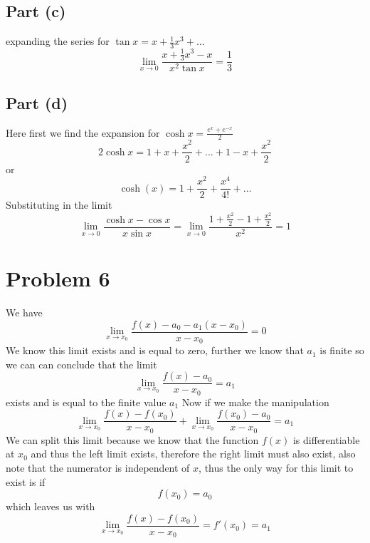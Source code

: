 \documentclass[12pt]{article}
\begin{document}
\subsection{Part (c)}
expanding the series for $\tan x = x + \frac{1}{3 }x^{3} + \dots$ 
$$
\lim_{ x \to 0 } \frac{x + \frac{1}{3}x^{3}-x}{x^{2}\tan x} = \frac{1}{3}
$$
\subsection{Part (d)}
Here first we find the expansion for $\cosh x = \frac{e^{ x } + e^{ -x }}{2}$
$$
2\cosh x = 1 + x + \frac{x^{2}}{2} + \dots + 1-x + \frac{x^{2}}{2}
$$
or
$$
\cosh(x) = 1 + \frac{x^{2}}{2} + \frac{x^{4}}{4!} + \dots
$$
Substituting in the limit
$$
\lim_{  x \to 0 } \frac{\cosh x - \cos x}{x\sin x} = \lim_{ x \to 0 } \frac{1+\frac{x^{2}}{2} -1 + \frac{x^{2}}{2}}{x^{2}} = 1
$$

\section*{Problem 6}
We have
$$
\lim_{ x \to x_{0} } \frac{f(x) -a_{0} -a_{1}(x-x_{0})}{x-x_{0}} = 0
$$
We know this limit exists and is equal to zero, further we know that $a_{1}$
 is finite so we can can conclude that the limit
 $$
\lim_{ x \to x_{0} } \frac{f(x)-a_{0}}{x-x_{0}} = a_{1}
$$
exists and is equal to the finite value $a_{1}$ Now if we make the manipulation
$$
\lim_{ x \to x_{0} } \frac{f(x)-f(x_{0})}{x-x_{0}} + \lim_{ x \to x_{0} } \frac{f(x_{0})-a_{0}}{x-x_{0}} = a_{1}
$$
We can split this limit because we know that the function $f(x)$ is differentiable at $x_{0}$ and thus the left limit exists, therefore the right limit must also exist, also note that the numerator is independent of $x$, thus the only way for this limit to exist is if
$$
f(x_{0}) = a_{0}
$$
which leaves us with
$$
\lim_{ x \to x_{0} } \frac{f(x)-f(x_{0})}{x-x_{0}} = f'(x_{0}) = a_{1}
$$
\end{document}

